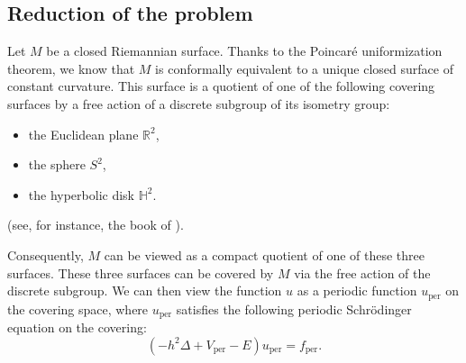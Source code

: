 \documentclass[leqno,11pt,letterpaper, english]{amsart}
\theoremstyle{plain}
\theoremstyle{definition}
\numberwithin{equation}{section}
\begin{document}
\subsection{Reduction of the problem}
\label{subsect: Uniformization}
Let \( M \) be a closed Riemannian surface. Thanks to the Poincar\'e uniformization theorem, 
we know that \( M \) is conformally equivalent to a unique closed surface of constant curvature. This surface is a quotient of one of the following covering surfaces by a free action of a discrete subgroup of its isometry group:
\begin{itemize}
    \item the Euclidean plane \( \mathbb{R}^2 \),
    \item the sphere \( S^2 \),
    \item the hyperbolic disk \( \mathbb{H}^2 \). 
\end{itemize}
(see, for instance, the book of \cite{de2016uniformization}).

Consequently, \( M \) can be viewed as a compact quotient of one of these three surfaces. 
These three surfaces can be covered by \( M \) via the free action of the discrete subgroup. We can then view the function \( u \) as a periodic function \( u_{\text{per}} \) on the covering space,
where \( u_{\text{per}} \) satisfies the following periodic Schr\"odinger equation on the covering:
\begin{equation}
    (-h^2\Delta + V_{\text{per}} - E)u_{\text{per}} = f_{\text{per}}.
\end{equation}
\end{document}
